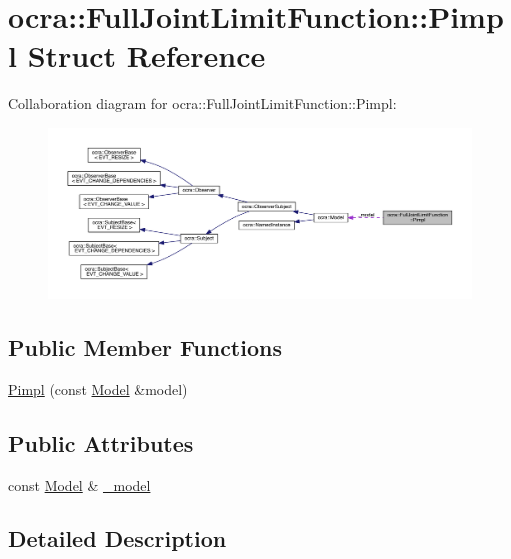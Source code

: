 \hypertarget{structFullJointLimitFunction_1_1Pimpl}{}\section{ocra\+:\+:Full\+Joint\+Limit\+Function\+:\+:Pimpl Struct Reference}
\label{structFullJointLimitFunction_1_1Pimpl}


Collaboration diagram for ocra\+:\+:Full\+Joint\+Limit\+Function\+:\+:Pimpl\+:\nopagebreak
\begin{figure}[H]
\begin{center}
\leavevmode
\includegraphics[width=350pt]{d5/d61/structFullJointLimitFunction_1_1Pimpl__coll__graph}
\end{center}
\end{figure}
\subsection*{Public Member Functions}
\begin{DoxyCompactItemize}
\item 
\hyperlink{structFullJointLimitFunction_1_1Pimpl_aa3d5e5c11c4204da38bb6086315e22d8}{Pimpl} (const \hyperlink{classocra_1_1Model}{Model} \&model)
\end{DoxyCompactItemize}
\subsection*{Public Attributes}
\begin{DoxyCompactItemize}
\item 
const \hyperlink{classocra_1_1Model}{Model} \& \hyperlink{structFullJointLimitFunction_1_1Pimpl_a1405a83bd59c5c592bec3e5ec1f394ca}{\+\_\+model}
\end{DoxyCompactItemize}


\subsection{Detailed Description}


